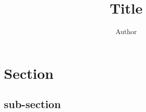 \documentclass[12pt]{article}
\title{\vspace{-10ex}Title}
\author{Author}
\date{}
\begin{document}
\maketitle

\section*{Section}
\subsection*{sub-section}
\end{document}
